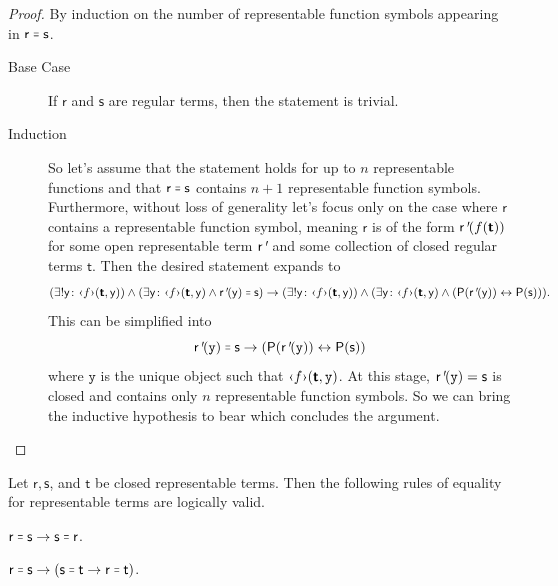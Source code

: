 \documentclass{article}
\theoremstyle{customstyle}
\newenvironment{prf}{\begin{mdframed}[skipabove=5pt, backgroundcolor=Gray!10, topline=false, bottomline=false, leftline=false, rightline=false]\begin{proof}}{\end{proof}\end{mdframed}}
\newcommand{\qu}[1]{\mathsf{#1}}
\newcommand{\fm}[1]{\mathsf{#1}}
\newcommand{\fmc}[1]{\mathtt{#1}}
\newcommand{\rep}[1]{\text{\guilsinglleft$#1$\guilsinglright}}
\newcommand{\fmtick}{\emph{\textquotesingle}}
\newcommand{\fmeq}{\mathrel{\resizebox{1.15\height}{1.15\height}{=}}}
\begin{document}
\begin{prf}
  By induction on the number of representable function symbols appearing in $\qu{r} \fmeq \qu{s}$.
  \begin{description}
    \item[Base Case]
          If $\fm{r}$ and $\fm{s}$ are regular terms, then the statement is trivial.
    \item[Induction]
          So let's assume that the statement holds for up to $n$ representable functions and that $\fm{r} \fmeq \fm{s}$ contains $n + 1$ representable function symbols. Furthermore, without loss of generality let's focus only on the case where $\fm{r}$ contains a representable function symbol, meaning $\fm{r}$ is of the form $\fm{r}\fmtick(f(\bm{\fm{t}}))$ for some open representable term $\fm{r}\fmtick$ and some collection of closed regular terms $\bm{\fm{t}}$. Then the desired statement expands to
          \[
            (\exists! \fm{y} \colon \rep{f}(\bm{\fm{t}}, \fm{y})) \land (\exists \fm{y} \colon \rep{f}(\bm{\fm{t}}, \fm{y}) \land \fm{r}\fmtick(\fm{y}) \fmeq \fm{s}) \rightarrow (\exists! \fm{y} \colon \rep{f}(\bm{\fm{t}}, \fm{y})) \land (\exists \fm{y} \colon \rep{f}(\bm{\fm{t}}, \fm{y}) \land (\fm{P}(\fm{r}\fmtick(\fm{y})) \leftrightarrow \fm{P}(\fm{s}))).
          \]
          This can be simplified into
          \[
            \fm{r}\fmtick(\fmc{y}) \fmeq \fm{s} \rightarrow (\fm{P}(\fm{r}\fmtick(\fmc{y})) \leftrightarrow \fm{P}(\fm{s}))
          \]
          where $\fmc{y}$ is the unique object such that $\rep{f}(\bm{\fm{t}}, \fmc{y})$. At this stage, $\fm{r}\fmtick(\fmc{y}) = \fm{s}$ is closed and contains only $n$ representable function symbols. So we can bring the inductive hypothesis to bear which concludes the argument.\qedhere
  \end{description}
\end{prf}

\begin{lemma}\label{lm-eq}
  Let $\fm{r}, \fm{s}$, and $\fm{t}$ be closed representable terms. Then the following rules of equality for representable terms are logically valid.
  \begin{description}[leftmargin=!, labelwidth=\widthof{Transitivity:}]
    \item[Symmetry] $\fm{r} \fmeq \fm{s} \rightarrow \fm{s} \fmeq \fm{r}$.
    \item[Transitivity] $\fm{r} \fmeq \fm{s} \rightarrow (\fm{s} \fmeq \fm{t} \rightarrow \fm{r} \fmeq \fm{t})$.
  \end{description}
\end{lemma}
\end{document}
